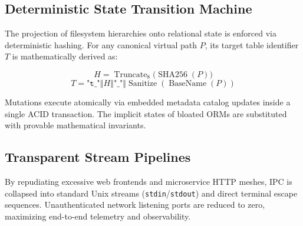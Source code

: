 \documentclass[10pt,a4paper,twocolumn]{article}
\newif\ifja
\begin{document}
\subsection{
\ifja 決定論的状態遷移マシン \else Deterministic State Transition Machine \fi
}
\ifja
ファイルシステムとリレーショナル構造の射影は、ハッシュ関数に基づく決定論的マッピングを行う。例えば、パス識別子 $P$ に対するテーブル識別子 $T$ は以下のように厳格に導出される。

\begin{equation}
    H = \operatorname{Truncate}_8\Big(\operatorname{SHA256}(P)\Big)
\end{equation}
\begin{equation}
    T = \texttt{"t\_"} \mathbin{\Vert} H \mathbin{\Vert} \texttt{"\_"} \mathbin{\Vert} \operatorname{Sanitize}(\operatorname{BaseName}(P))
\end{equation}

状態の変更（リネームや移動）は、メタデータ操作とカタログ更新を単一のACIDトランザクション内で不可分に実行する。暗黙のORMステートマシンを排し、数学的写像により整合性を証明する。
\else
The projection of filesystem hierarchies onto relational state is enforced via deterministic hashing. For any canonical virtual path $P$, its target table identifier $T$ is mathematically derived as:

\begin{equation}
    H = \operatorname{Truncate}_8\Big(\operatorname{SHA256}(P)\Big)
\end{equation}
\begin{equation}
    T = \texttt{"t\_"} \mathbin{\Vert} H \mathbin{\Vert} \texttt{"\_"} \mathbin{\Vert} \operatorname{Sanitize}(\operatorname{BaseName}(P))
\end{equation}

Mutations execute atomically via embedded metadata catalog updates inside a single ACID transaction. The implicit states of bloated ORMs are substituted with provable mathematical invariants.
\fi

\subsection{
\ifja 透過的なストリームパイプライン \else Transparent Stream Pipelines \fi
}
\ifja
重厚なWeb UIや外部クライアント・サーバ通信を排し、プロセス間通信は標準入出力（\texttt{stdin}/\texttt{stdout}）のストリーム、およびターミナルエスケープシーケンスを通じて直接転送で完結させる。不要なネットワークポートの開放をゼロに抑え、エンドツーエンドの観測性を極大化する。
\else
By repudiating excessive web frontends and microservice HTTP meshes, IPC is collapsed into standard Unix streams (\texttt{stdin}/\texttt{stdout}) and direct terminal escape sequences. Unauthenticated network listening ports are reduced to zero, maximizing end-to-end telemetry and observability.
\fi
\end{document}
